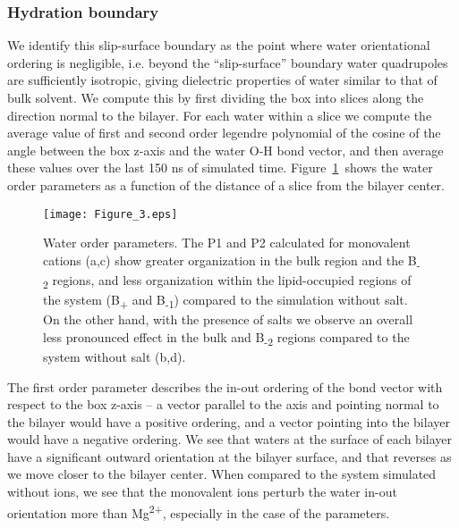 \subsubsection{Hydration boundary}
We {identify} this 
slip-surface boundary as the point where 
water orientational ordering is negligible, i.e.
beyond the ``slip-surface'' 
boundary water {quadrupoles} are {sufficiently isotropic,
giving dielectric properties of water similar to that of bulk solvent}.
We compute this by first dividing the box into 
slices along the direction normal to the bilayer. 
For each water within a slice we 
compute the average value of first and second order legendre polynomial of 
the cosine of the angle between the box z-axis and
the water O-H bond vector, and then average these values over the last 150 ns of simulated time.
Figure~\ref{figch3:h2order}~shows the water order parameters 
as a function of the distance of a slice from the bilayer center.
\begin{figure}[h!tb]
    \caption[Water orientational order parameters]{Water order parameters.   
        {The P1 and P2 calculated for monovalent cations (a,c) show greater 
            organization in the bulk region and the B\textsubscript{-2} regions, and less organization within 
            the lipid-occupied regions of the system (B\textsubscript{+} and B\textsubscript{-1}) compared to the simulation without salt. 
        } 
{On the other hand, with the presence of \mg salts we observe an overall less pronounced effect in the
bulk and B\textsubscript{-2} regions compared to the system without salt (b,d).}
}
    
    \label{figch3:h2order}
    \texttt{[image: Figure\_3.eps]}
\end{figure}

The first order parameter describes the in-out ordering of the bond vector with respect to the 
box z-axis -- a vector parallel to the axis and pointing normal to the bilayer would have a positive
ordering, and a vector pointing into the bilayer would have a negative ordering. We see that waters at the surface
of each bilayer have a significant outward orientation at the bilayer surface, and that reverses as we move
closer to the bilayer center. When compared to the system simulated without ions, we see that
the monovalent ions perturb the water in-out orientation 
more than Mg\textsuperscript{2+}, especially in the case of the \mgmicro
parameters.

